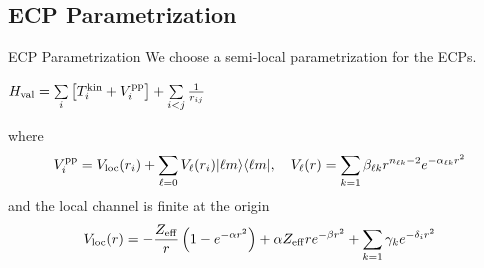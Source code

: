 \begin{frame}
\end{frame}

\subsection{ECP Parametrization}
\begin{frame}
    \begin{block}
	{ECP Parametrization}
	We choose a semi-local parametrization for the ECPs.\\ 
    \end{block}
    \begin{center}
        \begin{tcolorbox}[enhanced,drop lifted shadow,boxrule=0.1pt,colback=blue!15,width=0.41\textwidth]
            $H_{\rm val} = \sum\limits_i \left[ T_i^{\rm kin}+ V_i^{\rm pp} \right] +  \sum\limits_{i<j}\frac{1}{r_{ij}}$
        \end{tcolorbox}
    \end{center}
    where 
    \begin{equation*}
        V_i^{\rm pp} = V_{\rm loc}(r_i) + \sum\limits_{\ell = 0} V_{\ell}(r_i) | \ell m \rangle \langle \ell m |, \quad V_\ell(r) = \sum_{k=1} \beta_{\ell k} r^{n_{\ell k} -2}e^{-\alpha_{\ell k}r^2}
    \end{equation*}
    and the local channel is finite at the origin
    \begin{equation*}
	V_{\rm loc}(r) = -\frac{Z_{\rm eff}}{r}\left( 1-e^{-\alpha r^2} \right) + \alpha Z_{\rm eff} r e^{-\beta r^2} + \sum_{k=1} \gamma_k e^{-\delta_i r^2}
    \end{equation*}
\end{frame}

